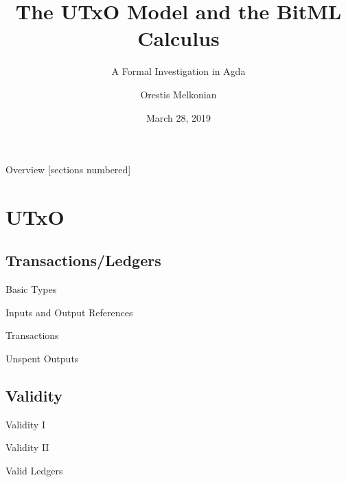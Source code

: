 \documentclass{beamer}
\title{The UTxO Model and the BitML Calculus}
\subtitle{A Formal Investigation in Agda}
\author{Orestis Melkonian}
\date{March 28, 2019}
\institute{Utrecht University, The Netherlands}
\begin{document}
\maketitle

\begin{frame}{Overview}
  [sections numbered]
  \tableofcontents
\end{frame}

\section{UTxO}
\subsection{Transactions/Ledgers}
\begin{frame}{Basic Types}
\UTXObasicTypes{}
\end{frame}

\begin{frame}{Inputs and Output References}
\UTXOinsOutRefs{}
\end{frame}

\begin{frame}{Transactions}
\UTXOoutTx{}
\end{frame}

\begin{frame}{Unspent Outputs}
\UTXOutxo{}
\end{frame}

\subsection{Validity}
\begin{frame}{Validity I}
\UTXOvalidA{}
\end{frame}

\begin{frame}{Validity II}
\UTXOvalidB{}
\end{frame}

\begin{frame}{Valid Ledgers}
\UTXOvalidLedgers{}
\end{frame}
\end{document}

